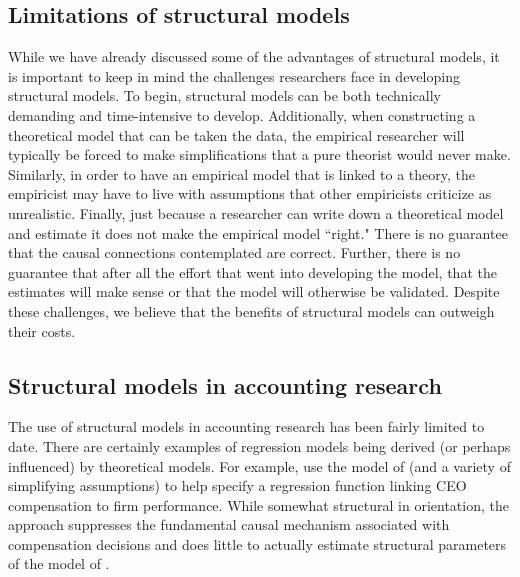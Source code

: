 \subsection{Limitations of structural models}

While we have already discussed some of the advantages of structural models, it is important to keep in mind the challenges researchers face in developing structural models. 
To begin, structural models can be both technically demanding and time-intensive to develop. 
Additionally, when constructing a theoretical model that can be taken the data, the
empirical researcher will typically be forced to make simplifications that a pure theorist would never make.
Similarly, in order to have an empirical model that is linked to a theory, the empiricist may have to live with assumptions that other empiricists criticize as
unrealistic. 
Finally, just because a researcher can write down a theoretical model and estimate it does not make the empirical model ``right."  
There is no guarantee that the causal connections contemplated are correct. 
Further, there is no guarantee that after all the effort that went into developing the model, that the estimates will make sense or that the model will otherwise be validated. 
Despite these challenges, we believe that the benefits of structural models can outweigh their costs.

\subsection{Structural models in accounting research}
The use of structural models in accounting research has been fairly limited to date.
There are certainly examples of regression models being derived (or perhaps influenced) by theoretical models.
For example, \citet{Lambert:1987} use the model of \citet{Holmstrom:1979aa} (and a variety of simplifying assumptions) to help specify a regression function linking CEO compensation to firm performance.
While somewhat structural in orientation, the approach suppresses the fundamental causal mechanism associated with compensation decisions and does little to actually estimate structural parameters of the model of \citet{Holmstrom:1979aa}.

